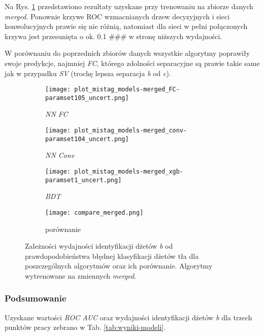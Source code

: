 Na Rys. \ref{fig:ROC_merged} przedstawiono rezultaty uzyskane przy trenowaniu na zbiorze danych \textit{merged}.
Ponownie krzywe ROC wzmacnianych drzew decyzyjnych i sieci konwolucyjnych prawie się nie różnią, natomiast dla sieci w pełni połączonych krzywa jest przesunięta o ok. 0.1 \#\#\# w stronę niższych wydajności.

W porównaniu do poprzednich zbiorów danych wszystkie algorytmy poprawiły swoje predykcje, najmniej \textit{FC}, którego zdolności separacyjne są prawie takie same jak w przypadku \textit{SV} (trochę lepsza separacja \textit{b} od \textit{c}).

\begin{figure}[ht]
	\centering
	
    \begin{subfigure}[b]{0.49\textwidth}
	\texttt{[image: plot\_mistag\_models-merged\_FC-paramset105\_uncert.png]}
	\caption{\textit{NN FC}}
	\end{subfigure}
    \begin{subfigure}[b]{0.49\textwidth}
	\texttt{[image: plot\_mistag\_models-merged\_conv-paramset104\_uncert.png]}	
	\caption{\textit{NN Conv}}
	\end{subfigure}
    \begin{subfigure}[b]{0.49\textwidth}
	\texttt{[image: plot\_mistag\_models-merged\_xgb-paramset1\_uncert.png]}
	\caption{\textit{BDT}}
	\end{subfigure}
	\begin{subfigure}[b]{0.49\textwidth}
	\texttt{[image: compare\_merged.png]}
	\caption{porównanie}
	\end{subfigure}
	
	\caption{Zależności wydajności identyfikacji dżetów \textit{b} od prawdopodobieństwa błędnej klasyfikacji dżetów tła dla poszczególnych algorytmów oraz ich porównanie. Algorytmy wytrenowane na zmiennych \textit{merged}.}
	\label{fig:ROC_merged}
\end{figure}

\clearpage
\FloatBarrier
\subsubsection{Podsumowanie}
\label{subsubsec:wyniki-modeli-podsum}

Uzyskane wartości \textit{ROC AUC} oraz wydajności identyfikacji dżetów \textit{b} dla trzech punktów pracy zebrano w Tab. \ref{tab:wyniki-modeli}.


